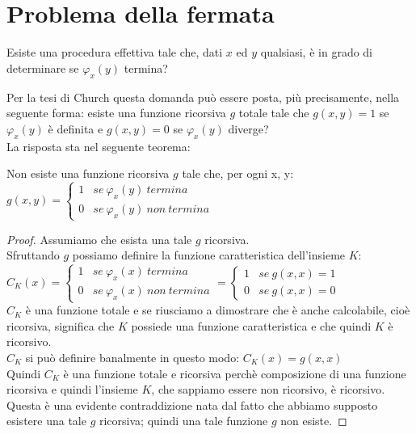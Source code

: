 \section{Problema della fermata}

Esiste una procedura effettiva tale che, dati $x$ ed $y$ qualsiasi, è
in grado di determinare se $\varphi_{x}(y)$ termina?

Per la tesi di Church questa domanda pu\`o essere posta, pi\`u precisamente,
nella seguente forma: esiste una funzione ricorsiva $g$ totale tale
che $g(x,y)=1$ se $\varphi_{x}(y)$ è definita e $g(x,y)=0$
se $\varphi_{x}(y)$ diverge?\\

La risposta sta nel seguente teorema:

\begin{thm}
  Non esiste una funzione ricorsiva $g$ tale che, per ogni x, y:\\

  $g(x,y)=\left\{ \begin{array}{ll}
  1 & se\ \varphi_{x}(y)\ termina\\
  0 & se\ \varphi_{x}(y)\ non\ termina\end{array}\right.$
\end{thm}

\begin{proof}
  Assumiamo che esista una tale $g$ ricorsiva.\\
  Sfruttando $g$ possiamo definire la funzione caratteristica dell'insieme $K$:\\

  $
    C_K(x)=\left\{ \begin{array}{ll}
    1 & se\ \varphi_x(x)\ termina\\
    0 & se\ \varphi_x(x)\ non\ termina\end{array}\right.
    =
    \left\{ \begin{array}{ll}
    1 & se\ g(x,x)=1\\
    0 & se\ g(x,x)=0\end{array}\right.
  $\\

  $C_K$ è una funzione totale e se riusciamo a dimostrare che è anche calcolabile, cioè ricorsiva, significa
  che $K$ possiede una funzione caratteristica e che quindi $K$ è ricorsivo.\\

  $C_K$ si può definire banalmente in questo modo: $C_K(x) = g(x,x)$\\

  Quindi $C_K$ è una funzione totale e ricorsiva perchè composizione di una funzione ricorsiva e quindi l'insieme $K$,
  che sappiamo essere non ricorsivo, è ricorsivo.\\
  Questa è una evidente contraddizione nata dal fatto che abbiamo supposto esistere una tale $g$ ricorsiva; quindi una tale
  funzione $g$ non esiste.
\end{proof}


